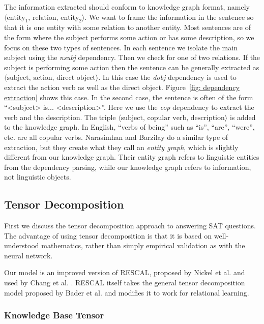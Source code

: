 \documentclass[pageno]{final_paper}
\begin{document}
The information extracted should conform to knowledge graph format, namely
\\$\langle \text{entity}_1, \,\text{relation}, \,\text{entity}_2 \rangle$. We
want to frame the information in the sentence so that it is one entity with some
relation to another entity. Most sentences are of the form where the subject
performs some action or has some description, so we focus on these two types of
sentences. In each sentence we isolate the main subject using the \textit{nsubj}
dependency. Then we check for one of two relations. If the subject is performing
some action then the sentence can be generally extracted as $\langle
\text{subject}, \,\text{action}, \,\text{direct object} \rangle$. In this case
the \textit{dobj} dependency is used to extract the action verb as well as the
direct object. Figure~\ref{fig: dependency extraction} shows this case. In the
second case, the sentence is often of the form ``<subject> is...
<description>''. Here we use the \textit{cop} dependency to extract the verb and
the description. The triple $\langle \text{subject}, \,\text{copular verb},
\,\text{description} \rangle$ is added to the knowledge graph. In English,
``verbs of being'' such as ``is'', ``are'', ``were'', etc. are all copular
verbs. Narasimhan and Barzilay \cite{Narasimhan2015} do a similar type of
extraction, but they create what they call an \textit{entity graph}, which is
slightly different from our knowledge graph. Their entity graph refers to
linguistic entities from the dependency parsing, while our knowledge graph
refers to information, not linguistic objects.

\subsection{Tensor Decomposition}
\label{Tensor Decomposition}

First we discuss the tensor decomposition approach to answering SAT questions.
The advantage of using tensor decomposition is that it is based on
well-understood mathematics, rather than simply empirical validation as with the
neural network.

Our model is an improved version of RESCAL, proposed by Nickel et al.
\cite{Nickel2011} and used by Chang et al. \cite{Chang2014}. RESCAL itself takes
the general tensor decomposition model proposed by Bader et al. \cite{Bader2007}
and modifies it to work for relational learning. \\

\subsubsection{Knowledge Base Tensor}
\label{Knowledge Base Tensor}
\end{document}
